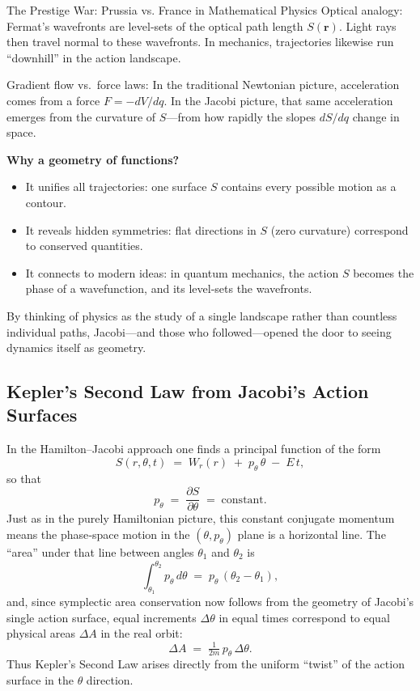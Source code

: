 \begin{HistoricalSidebar}{The Prestige War: Prussia vs. France in Mathematical Physics}
  Optical analogy: Fermat’s wavefronts are level‐sets of the optical path length \(S(\mathbf{r})\).  Light rays then travel normal to these wavefronts.  In mechanics, trajectories likewise run “downhill” in the action landscape.

  Gradient flow vs.\ force laws:  In the traditional Newtonian picture, acceleration comes from a force \(F = -dV/dq\).  In the Jacobi picture, that same acceleration emerges from the curvature of \(S\)—from how rapidly the slopes \(dS/dq\) change in space.

\textbf{Why a geometry of functions?}

\begin{itemize}
  \item It unifies all trajectories: one surface \(S\) contains every possible motion as a contour.
  \item It reveals hidden symmetries: flat directions in \(S\) (zero curvature) correspond to conserved quantities.
  \item It connects to modern ideas: in quantum mechanics, the action \(S\) becomes the phase of a wavefunction, and its level‐sets the wavefronts.
\end{itemize}

By thinking of physics as the study of a single landscape rather than countless individual paths, Jacobi—and those who followed—opened the door to seeing dynamics itself as geometry.  




\subsection{Kepler’s Second Law from Jacobi’s Action Surfaces}

In the Hamilton–Jacobi approach one finds a principal function of the form
\[
S(r,\theta,t) \;=\; W_r(r)\;+\;p_\theta\,\theta \;-\;E\,t,
\]
so that
\[
p_\theta \;=\;\frac{\partial S}{\partial \theta}
\;=\;\text{constant}.
\]
Just as in the purely Hamiltonian picture, this constant conjugate momentum means the phase‐space motion in the \((\theta,p_\theta)\) plane is a horizontal line.  The “area” under that line between angles \(\theta_1\) and \(\theta_2\) is
\[
\int_{\theta_1}^{\theta_2} p_\theta\,d\theta
\;=\;
p_\theta\,(\theta_2-\theta_1),
\]
and, since symplectic area conservation now follows from the geometry of Jacobi’s single action surface, equal increments \(\Delta\theta\) in equal times correspond to equal physical areas \(\Delta A\) in the real orbit:
\[
\Delta A \;=\;\tfrac{1}{2m}\,p_\theta\,\Delta\theta.
\]
Thus Kepler’s Second Law arises directly from the uniform “twist” of the action surface in the \(\theta\) direction.


\end{HistoricalSidebar}
